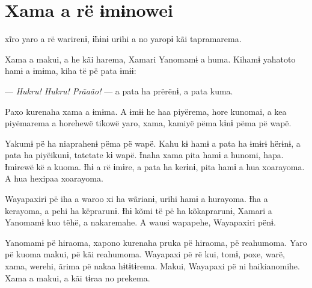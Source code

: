 

\chapter{Xama a rë ɨmɨnowei}
 
 xĩro yaro a rë warirenɨ, ɨ̃hɨnɨ urihi a no yaropɨ kãi tapramarema. 

Xama a makui, a he kãi harema, Xamari Yanomamɨ a huma. Kihamɨ yahatoto
hamɨ a ɨmɨma, kiha të pë pata ɨmɨɨ: 

--- \textit{Hukru! Hukru! Prãaão!} --- a pata ha prërënɨ, a pata kuma. 

Paxo kurenaha xama a ɨmɨma. A ɨmɨɨ he haa piyërema, hore kunomai, a kea
piyëmarema a horehewë tikowë yaro, xama, kamiyë pëma kɨnɨ pëma pë wapë. 

Yakumɨ pë ha niaprahenɨ pëma pë wapë. Kahu kɨ hamɨ a pata ha ɨmɨrɨ
hërɨnɨ, a pata ha piyëikunɨ, tatetate kɨ wapë. Ɨnaha xama pita hamɨ a
hunomi, hapa. Ɨmɨrewë kë a kuoma. Ɨhɨ a rë ɨmɨre, a pata ha kerɨnɨ, pita
hamɨ a hua xoarayoma. A hua hexipaa xoarayoma. 

Wayapaxiri pë iha a waroo xi ha wãrianɨ, urihi hamɨ a hurayoma. Ɨha a
kerayoma, a pehi ha këprarunɨ. Ɨhɨ kõmi të pë ha kõkaprarunɨ, Xamari a
Yanomamɨ kuo tëhë, a nakaremahe. A wausi wapapehe, Wayapaxiri pënɨ.

 Yanomamɨ pë hiraoma, xapono kurenaha pruka pë hiraoma, pë reahumoma.
Yaro pë kuoma makui, pë kãi reahumoma. Wayapaxi pë rë kui, tomɨ, poxe,
warë, xama, werehi, ãrima pë nakaa hɨtɨtɨrema. Makui, Wayapaxi pë ni
haikianomihe. Xama a makui, a kãi tɨraa no prekema. 


